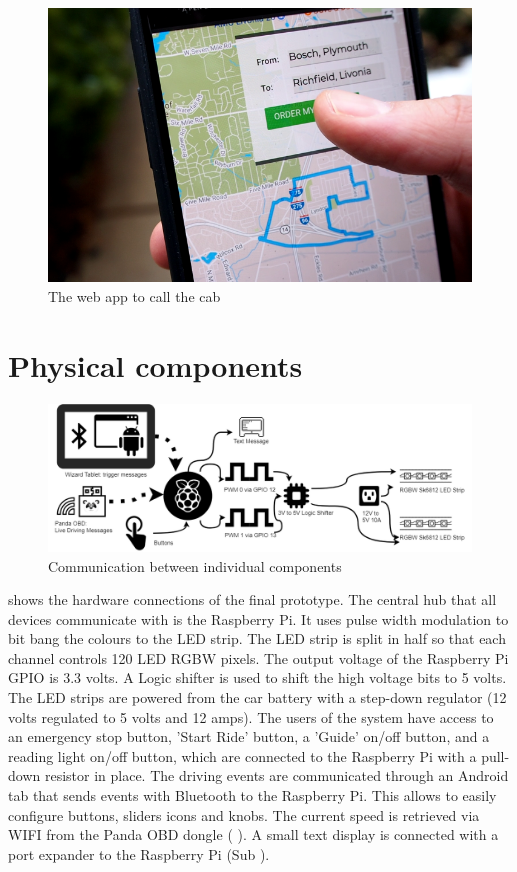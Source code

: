 \begin{figure}
    \includegraphics[width=\textwidth]{fig/capp}
    \caption[Call a Cab App]{The web app to call the cab}
    \label{fig:capp}
\end{figure}

\section{Physical components}
\label{sec:physical}

\begin{figure}
    \includegraphics[width=1\textwidth]{fig/wizardfinal}
    \caption[Communication Overview]{Communication between individual components}
    \label{fig:communication}
\end{figure}

\emph{} shows the hardware connections of the final prototype. The central hub that all devices communicate with is the Raspberry Pi. It uses pulse width modulation to bit bang the colours to the LED strip. The LED strip is split in half so that each channel controls 120 LED RGBW pixels. The output voltage of the Raspberry Pi GPIO is 3.3 volts. A Logic shifter is used to shift the high voltage bits to 5 volts. The LED strips are powered from the car battery with a step-down regulator (12 volts regulated to 5 volts and 12 amps). The users of the system have access to an emergency stop button, 'Start Ride' button, a 'Guide' on/off button, and a reading light on/off button, which are connected to the Raspberry Pi with a pull-down resistor in place. The driving events are communicated through an Android tab that sends events with Bluetooth to the Raspberry Pi. This allows to easily configure buttons, sliders icons and knobs. The current speed is retrieved via WIFI from the Panda OBD dongle ( \emph{}). A small text display is connected with a port expander to the Raspberry Pi (Sub \emph{}). 

